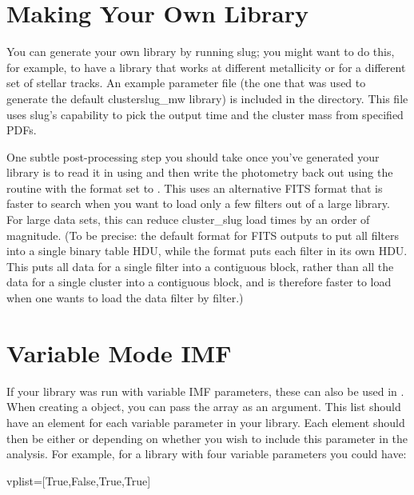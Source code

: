 \documentclass[letterpaper,10pt,english]{sphinxmanual}
\begin{document}
\section{Making Your Own Library}
\label{\detokenize{cluster_slug:making-your-own-library}}
You can generate your own library by running slug; you might want to do this, for example, to have a library that works at different metallicity or for a different set of stellar tracks. An example parameter file (the one that was used to generate the default clusterslug\_mw library) is included in the  directory. This file uses slug’s capability to pick the output time and the cluster mass from specified PDFs.

One subtle post-processing step you should take once you’ve generated your library is to read it in using {\hyperref[\detokenize{slugpy:sec-slugpy}]{}} and then write the photometry back out using the  routine with the format set to . This uses an alternative FITS format that is faster to search when you want to load only a few filters out of a large library. For large data sets, this can reduce cluster\_slug load times by an order of magnitude. (To be precise: the default format for FITS outputs to put all filters into a single binary table HDU, while the  format puts each filter in its own HDU. This puts all data for a single filter into a contiguous block, rather than all the data for a single cluster into a contiguous block, and is therefore faster to load when one wants to load the data filter by filter.)


\section{Variable Mode IMF}
\label{\detokenize{cluster_slug:variable-mode-imf}}
If your library was run with variable IMF parameters, these can also be used in . When creating a  object, you can pass the array  as an argument. This list should have an element for each variable parameter in your library. Each element should then be either  or  depending on whether you wish to include this parameter in the analysis.
For example, for a library with four variable parameters you could have:

\begin{sphinxVerbatim}[commandchars=\\\{\}]
vp\PYGZus{}list=[True,False,True,True]
\end{sphinxVerbatim}
\end{document}
